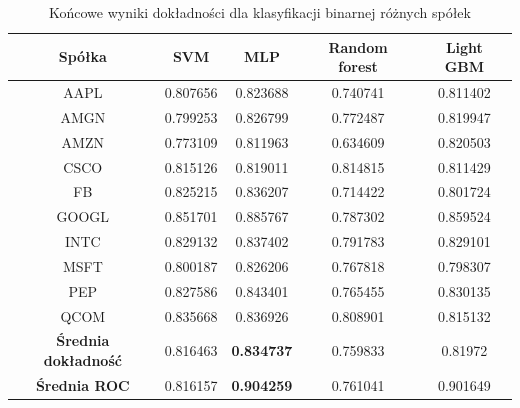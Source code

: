\documentclass[a4paper, twoside, 11pt, openright]{article}
\begin{document}
 \begin{table}[H]
    \centering
    \begin{tabular}{|c|c|c|c|c|}
    \hline
        \textbf{Spółka} & \textbf{SVM} &  \textbf{MLP}  &  \textbf{Random forest}  &  \textbf{Light GBM} \\ \hline
AAPL   &  0.807656 & 0.823688  & 0.740741 & 0.811402\\ \hline
AMGN   &  0.799253 &  0.826799 &0.772487 &  0.819947 \\ \hline
AMZN   &  0.773109 & 0.811963 & 0.634609 & 0.820503 \\ \hline
CSCO   &  0.815126 &  0.819011 & 0.814815 &  0.811429 \\ \hline
FB     &  0.825215 & 0.836207 & 0.714422 & 0.801724 \\ \hline
GOOGL  &  0.851701 &  0.885767 & 0.787302 & 0.859524 \\ \hline
INTC   &  0.829132 & 0.837402  & 0.791783 & 0.829101 \\ \hline
MSFT   &  0.800187 &   0.826206 & 0.767818 &  0.798307\\ \hline
PEP    &  0.827586 & 0.843401  & 0.765455 & 0.830135 \\ \hline
QCOM   &  0.835668 &  0.836926 & 0.808901 & 0.815132 \\ \hline \hline
\textbf{Średnia dokładność} &  0.816463 & \textbf{0.834737} & 0.759833 & 0.81972 \\  \hline  
\textbf{Średnia ROC} &  0.816157 & \textbf{0.904259} & 0.761041 & 0.901649 \\  \hline
    \end{tabular}
    \caption{Końcowe wyniki dokładności dla klasyfikacji binarnej różnych spółek}
    \label{tab:comparison_final_binary}
\end{table}   
\end{document}
